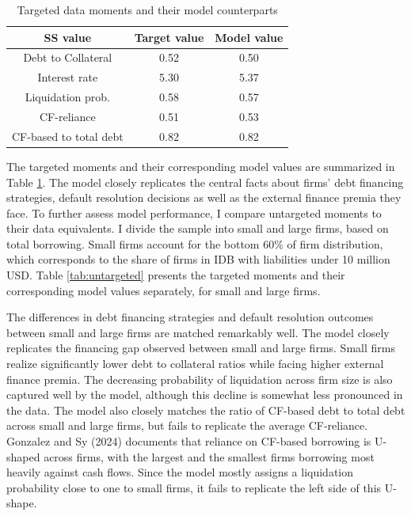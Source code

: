 \documentclass[12pt]{article}
\begin{document}
\begin{table}[h!]
    \centering
    \begin{tabular}{c|cc}
    \toprule
    \textbf{SS value} & \textbf{Target value} & \textbf{Model value} \\ 
    \midrule
    Debt to Collateral & 0.52 & 0.50 \\ 
    Interest rate & 5.30 & 5.37 \\ 
    Liquidation prob. & 0.58 & 0.57 \\ 
    CF-reliance & 0.51 & 0.53 \\ 
    CF-based to total debt & 0.82 & 0.82 \\ 
    \bottomrule
    \end{tabular}
    \caption{\small Targeted data moments and their model counterparts}
    \label{tab:targets}
\end{table}

\noindent The targeted moments and their corresponding model values are summarized in Table \ref{tab:targets}. The model closely replicates the central facts about firms' debt financing strategies, default resolution decisions as well as the external finance premia they face. To further assess model performance, I compare untargeted moments to their data equivalents. I divide the sample into small and large firms, based on total borrowing. Small firms account for the bottom 60\% of firm distribution, which corresponds to the share of firms in IDB with liabilities under 10 million USD. Table \ref{tab:untargeted} presents the targeted moments and their corresponding model values separately, for small and large firms.

The differences in debt financing strategies and default resolution outcomes between small and large firms are matched remarkably well. The model closely replicates the financing gap observed between small and large firms. Small firms realize significantly lower debt to collateral ratios while facing higher external finance premia. The decreasing probability of liquidation across firm size is also captured well by the model, although this decline is somewhat less pronounced in the data. The model also closely matches the ratio of CF-based debt to total debt across small and large firms, but fails to replicate the average CF-reliance. Gonzalez and Sy (2024) documents that reliance on CF-based borrowing is U-shaped across firms, with the largest and the smallest firms borrowing most heavily against cash flows. Since the model mostly assigns a liquidation probability close to one to small firms, it fails to replicate the left side of this U-shape. 
\end{document}

